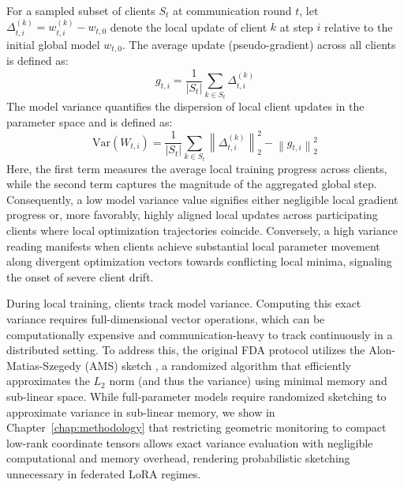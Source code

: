 For a sampled subset of clients $S_t$ at communication round $t$, let $\Delta_{t,i}^{(k)} = w_{t,i}^{(k)} - w_{t,0}$ denote the local update of client $k$ at step $i$ relative to the initial global model $w_{t,0}$. The average update (pseudo-gradient) across all clients is defined as:
\begin{equation}
    g_{t,i} = \frac{1}{|S_t|} \sum_{k \in S_t} \Delta_{t,i}^{(k)}
    \label{eq:fda_pseudo}
\end{equation}
The model variance quantifies the dispersion of local client updates in the parameter space and is defined as:
\begin{equation}
    \text{Var}(W_{t,i}) = \frac{1}{|S_t|} \sum_{k \in S_t} \left\| \Delta_{t,i}^{(k)} \right\|_2^2 - \left\| g_{t,i} \right\|_2^2
    \label{eq:fda_variance}
\end{equation}
Here, the first term measures the average local training progress across clients, while the second term captures the magnitude of the aggregated global step. Consequently, a low model variance value signifies either negligible local gradient progress or, more favorably, highly aligned local updates across participating clients where local optimization trajectories coincide. Conversely, a high variance reading manifests when clients achieve substantial local parameter movement along divergent optimization vectors towards conflicting local minima, signaling the onset of severe client drift.


During local training, clients track model variance. Computing this exact variance requires full-dimensional vector operations, which can be computationally expensive and communication-heavy to track continuously in a distributed setting. To address this, the original FDA protocol \cite{theologitis2025communication} utilizes the Alon-Matias-Szegedy (AMS) sketch \cite{alon1996space}, a randomized algorithm that efficiently approximates the $L_2$ norm (and thus the variance) using minimal memory and sub-linear space. While full-parameter models require randomized sketching to approximate variance in sub-linear memory, we show in Chapter~\ref{chap:methodology} that restricting geometric monitoring to compact low-rank coordinate tensors allows exact variance evaluation with negligible computational and memory overhead, rendering probabilistic sketching unnecessary in federated LoRA regimes.

